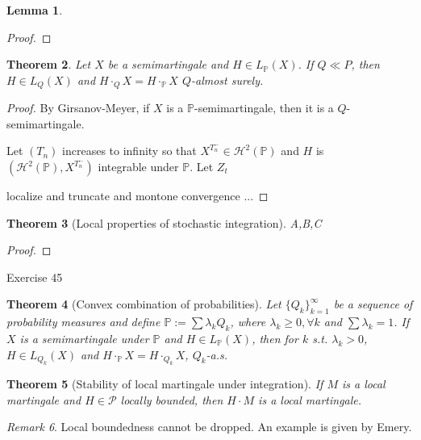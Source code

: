 \documentclass[openany,oneside]{book}
\newtheorem{thm}{Theorem}[section]
\newtheorem{lem}[thm]{Lemma}
\theoremstyle{definition}
\theoremstyle{remark}
\newtheorem{rem}[thm]{Remark}
\newcommand{\E}{\mathbb{E}} %
\renewcommand{\P}{\mathbb{P}} %
\DeclarePairedDelimiter{\norm}{\lVert}{\rVert} %
\renewcommand{\d}{\mathrm{d}} %
\newcommand{\sH}[1][2]{\mathcal{H}^{#1}} %
\newcommand{\pred}{\mathcal{P}} %
\begin{document}
\begin{lem}
\end{lem}
\begin{proof}

\end{proof}

\begin{thm}
Let $X$ be a semimartingale and $H\in L_{\P}(X)$. If $Q\ll P$, then $H\in L_Q(X)$ and $H\cdot_Q X = H\cdot_{\P} X$ $Q$-almost surely.
\end{thm}
\begin{proof}
By Girsanov-Meyer, if $X$ is a $\P$-semimartingale, then it is a $Q$-semimartingale.
\par
Let $(T_n)$ increases to infinity so that $X^{T_n^-} \in \sH(\P)$ and $H$ is $(\sH(\P),X^{T_n^-})$ integrable under $\P$. Let $Z_t$
\par
localize and truncate and montone convergence ...
\end{proof}

\begin{thm}[Local properties of stochastic integration]
A,B,C
\end{thm}
\begin{proof}


\end{proof}

Exercise 45


\begin{thm}[Convex combination of probabilities]
Let $\{Q_k\}_{k=1}^\infty$ be a sequence of probability measures and define $\P:=\sum \lambda_k Q_k$, where $\lambda_k \ge 0, \forall k$ and $\sum \lambda_k = 1$. If $X$ is a semimartingale under $\P$ and $H\in L_{\P}(X)$, then for $k$ s.t. $\lambda_k >0$, $H\in L_{Q_k}(X)$ and $H\cdot_{\P} X = H\cdot_{Q_k} X$, $Q_k$-a.s.
\end{thm}

\begin{thm}[Stability of local martingale under integration] \label{stab_loc_mg}
If $M$ is a local martingale and $H\in \pred$ locally bounded, then $H\cdot M$ is a local martingale.
\end{thm}
\begin{rem}
Local boundedness cannot be dropped. An example is given by Emery.
\end{rem}
\end{document}
